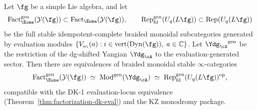 \begin{conjecture}
\label{conj:restricted-dk5}%
%
%
%
Let $\fg$ be a simple Lie algebra, and let
\[
\operatorname{Fact}_{\Eone}^{\mathrm{gen}}(\mathcal{Y}(\fg))
\subset \operatorname{Fact}_{\Eone}(\mathcal{Y}(\fg)),
\qquad
\operatorname{Rep}_{\mathrm{fd}}^{\mathrm{gen}}(U_q(L\fg))
\subset \operatorname{Rep}(U_q(L\fg))
\]
be the full stable idempotent-complete braided monoidal subcategories
generated by evaluation modules
$\{V_{\omega_i}(a) : i \in \mathrm{vert}(\mathrm{Dyn}(\fg)),\;
a \in \mathbb{C}\}$. Let
${\Ydg_{\cA}}^{\mathrm{gen}}$ be the restriction of the dg-shifted
Yangian $\Ydg_{\cA}$ to the evaluation-generated sector. Then
there are equivalences of braided monoidal stable
$\infty$-categories
\begin{equation}\label{eq:restricted-dk5-triple}
\operatorname{Fact}_{\Eone}^{\mathrm{gen}}(\mathcal{Y}(\fg))
\;\simeq\;
\operatorname{Mod}^{\mathrm{gen}}(\Ydg_{\cA})
\;\simeq\;
\operatorname{Rep}_{\mathrm{fd}}^{\mathrm{gen}}(U_q(L\fg))^{\mathrm{op}},
\end{equation}
compatible with the DK-1 evaluation-locus equivalence
\textup{(}Theorem~\textup{\ref{thm:factorization-dk-eval}}\textup{)}
and the KZ monodromy package.
\end{conjecture}

